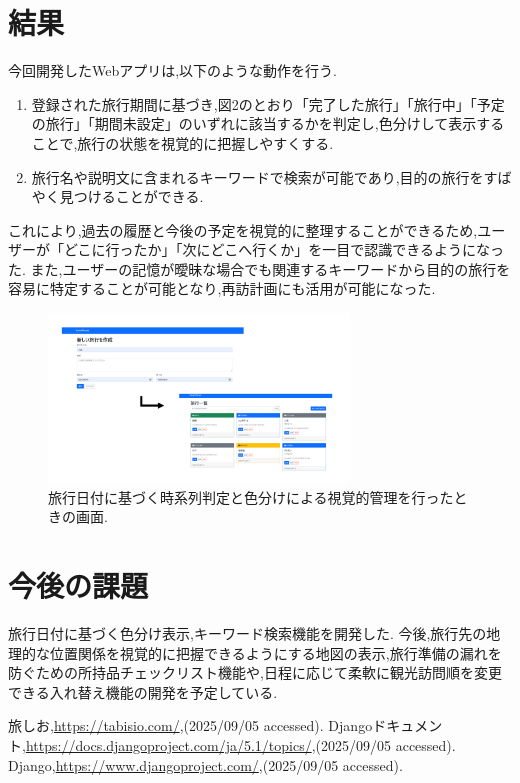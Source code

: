 \documentclass[a4j,twocolumn]{jsarticle}
\begin{document}
\section{結果}
\label{sec:orgc5c9d0a}
今回開発したWebアプリは,以下のような動作を行う.

\begin{enumerate}
\item 登録された旅行期間に基づき,図2のとおり「完了した旅行」「旅行中」「予定の旅行」「期間未設定」のいずれに該当するかを判定し,色分けして表示することで,旅行の状態を視覚的に把握しやすくする.
\item 旅行名や説明文に含まれるキーワードで検索が可能であり,目的の旅行をすばやく見つけることができる.
\end{enumerate}
これにより,過去の履歴と今後の予定を視覚的に整理することができるため,ユーザーが「どこに行ったか」「次にどこへ行くか」を一目で認識できるようになった.
また,ユーザーの記憶が曖昧な場合でも関連するキーワードから目的の旅行を容易に特定することが可能となり,再訪計画にも活用が可能になった.

\begin{figure}[htbp]
\centering
\includegraphics[width=8cm]{./figs/trip1.png}
\caption{\label{fig:orgd4e64f4}旅行日付に基づく時系列判定と色分けによる視覚的管理を行ったときの画面.}
\end{figure}
\section{今後の課題}
\label{sec:org579cd9d}
旅行日付に基づく色分け表示,キーワード検索機能を開発した.
今後,旅行先の地理的な位置関係を視覚的に把握できるようにする地図の表示,旅行準備の漏れを防ぐための所持品チェックリスト機能や,日程に応じて柔軟に観光訪問順を変更できる入れ替え機能の開発を予定している.




\small\setlength\baselineskip{10pt}
\begin{thebibliography}{9}

 旅しお,\url{https://tabisio.com/},(2025/09/05 accessed).
Djangoドキュメント,\url{https://docs.djangoproject.com/ja/5.1/topics/},(2025/09/05 accessed).
Django,\url{https://www.djangoproject.com/},(2025/09/05 accessed).
\end{thebibliography}
\end{document}
